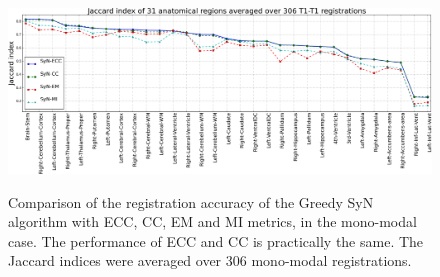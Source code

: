 \begin{figure}[t!]
\centering
\includegraphics[width=0.95\linewidth]{images/mono_lines_seg.png}\\
\caption{{\small Comparison of the registration accuracy of the Greedy SyN algorithm with ECC, CC, EM and MI metrics, in the mono-modal case. The performance of ECC and CC is practically the same. The Jaccard indices were averaged over 306 mono-modal registrations.}}
\label{fig:mono_graph_seg}\figcloser
\end{figure}

